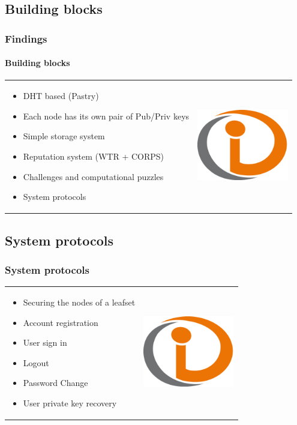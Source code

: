 \subsection{Building blocks}
\begin{frame}
\frametitle{Findings}
\framesubtitle{Building blocks}
\begin{table}
\begin{tabular}{p{7cm}p{3cm}}
\begin{itemize}
  \item DHT based (Pastry)
  \item Each node has its own pair of Pub/Priv keys
  \item Simple storage system
  \item Reputation system (WTR + CORPS)
  \item Challenges and computational puzzles
  \item System protocols
\end{itemize}
&
\vspace{1.5cm}
\includegraphics[width=4cm]{img/example}\\
\end{tabular}
\end{table}
\end{frame}

\subsection{System protocols}
\begin{frame}
\frametitle{System protocols}
\begin{table}
\begin{tabular}{p{7cm}p{3cm}}
\begin{itemize}
  \item Securing the nodes of a leafset
  \item Account registration
  \item User sign in
  \item Logout
  \item Password Change
  \item User private key recovery
\end{itemize}
&
\vspace{1.5cm}
\includegraphics[width=4cm]{img/example}\\
\end{tabular}
\end{table}
\end{frame}

